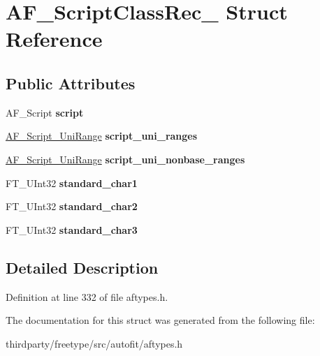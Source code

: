 \hypertarget{struct_a_f___script_class_rec__}{}\section{A\+F\+\_\+\+Script\+Class\+Rec\+\_\+ Struct Reference}
\label{struct_a_f___script_class_rec__}
\subsection*{Public Attributes}
\begin{DoxyCompactItemize}
\item 
\mbox{\label{struct_a_f___script_class_rec___a7567c6bb55125a44344cb339f07ea036}} 
A\+F\+\_\+\+Script {\bfseries script}
\item 
\mbox{\label{struct_a_f___script_class_rec___ae581f78a2c9ad7ae04e52dccbd59965b}} 
\hyperlink{struct_a_f___script___uni_range_rec__}{A\+F\+\_\+\+Script\+\_\+\+Uni\+Range} {\bfseries script\+\_\+uni\+\_\+ranges}
\item 
\mbox{\label{struct_a_f___script_class_rec___a724f5556087c2be0909e700205a19db1}} 
\hyperlink{struct_a_f___script___uni_range_rec__}{A\+F\+\_\+\+Script\+\_\+\+Uni\+Range} {\bfseries script\+\_\+uni\+\_\+nonbase\+\_\+ranges}
\item 
\mbox{\label{struct_a_f___script_class_rec___a095377ba50dce4c74706e7454cbce9ac}} 
F\+T\+\_\+\+U\+Int32 {\bfseries standard\+\_\+char1}
\item 
\mbox{\label{struct_a_f___script_class_rec___a0982fbb3fb8c45de33dca792d7f76140}} 
F\+T\+\_\+\+U\+Int32 {\bfseries standard\+\_\+char2}
\item 
\mbox{\label{struct_a_f___script_class_rec___aa23f6e7ffad2518f27e6b11981a00e59}} 
F\+T\+\_\+\+U\+Int32 {\bfseries standard\+\_\+char3}
\end{DoxyCompactItemize}


\subsection{Detailed Description}


Definition at line 332 of file aftypes.\+h.



The documentation for this struct was generated from the following file\+:\begin{DoxyCompactItemize}
\item 
thirdparty/freetype/src/autofit/aftypes.\+h\end{DoxyCompactItemize}
